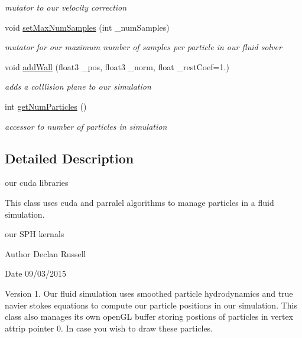 \begin{DoxyCompactItemize}
\begin{DoxyCompactList}\small\item\em mutator to our velocity correction \end{DoxyCompactList}\item 
void \hyperlink{class_s_p_h_engine_aad9d9bc9a1a7e5f64a5e045c339f8b3e}{set\-Max\-Num\-Samples} (int \-\_\-num\-Samples)
\begin{DoxyCompactList}\small\item\em mutator for our maximum number of samples per particle in our fluid solver \end{DoxyCompactList}\item 
void \hyperlink{class_s_p_h_engine_aa53becc41023eb45601eb3060860193a}{add\-Wall} (float3 \-\_\-pos, float3 \-\_\-norm, float \-\_\-rest\-Coef=1.)
\begin{DoxyCompactList}\small\item\em adds a colllision plane to our simulation \end{DoxyCompactList}\item 
\hypertarget{class_s_p_h_engine_a387ab48532ca20b2eb31319e862e243b}{int \hyperlink{class_s_p_h_engine_a387ab48532ca20b2eb31319e862e243b}{get\-Num\-Particles} ()}\label{class_s_p_h_engine_a387ab48532ca20b2eb31319e862e243b}

\begin{DoxyCompactList}\small\item\em accessor to number of particles in simulation \end{DoxyCompactList}\end{DoxyCompactItemize}


\subsection{Detailed Description}
our cuda libraries 

This class uses cuda and parralel algorithms to manage particles in a fluid simulation.

our S\-P\-H kernals

\begin{DoxyAuthor}{Author}
Declan Russell 
\end{DoxyAuthor}
\begin{DoxyDate}{Date}
09/03/2015 
\end{DoxyDate}
\begin{DoxyVersion}{Version}
1. Our fluid simulation uses smoothed particle hydrodynamics and true navier stokes equations to compute our particle positions in our simulation. This class also manages its own open\-G\-L buffer storing postions of particles in vertex attrip pointer 0. In case you wish to draw these particles. 
\end{DoxyVersion}


